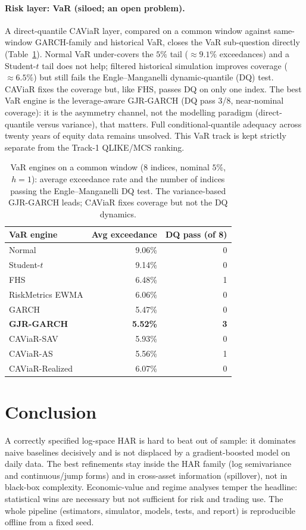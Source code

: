 \documentclass[11pt]{article}
\begin{document}
\paragraph{Risk layer: VaR (siloed; an open problem).} A direct-quantile CAViaR
\cite{engleman2004} layer, compared on a common window against same-window
GARCH-family \cite{bollerslev1986,gjr1993} and historical VaR, closes the VaR sub-question directly
(Table~\ref{tab:var}). Normal VaR under-covers the $5\%$ tail ($\approx 9.1\%$
exceedances) and a Student-$t$ tail does not help; filtered historical simulation
improves coverage ($\approx 6.5\%$) but still fails the Engle--Manganelli
dynamic-quantile (DQ) test. CAViaR fixes the coverage but, like FHS, passes DQ on
only one index. The best VaR engine is the leverage-aware GJR-GARCH (DQ pass 3/8,
near-nominal coverage): it is the asymmetry channel, not the modelling paradigm
(direct-quantile versus variance), that matters. Full conditional-quantile
adequacy across twenty years of equity data remains unsolved. This VaR track is
kept strictly separate from the Track-1 QLIKE/MCS ranking.

\begin{table}[h]
\centering
\caption{VaR engines on a common window (8 indices, nominal $5\%$, $h=1$): average
exceedance rate and the number of indices passing the Engle--Manganelli DQ test.
The variance-based GJR-GARCH leads; CAViaR fixes coverage but not the DQ dynamics.}
\label{tab:var}
\begin{tabular}{lrr}
\toprule
VaR engine & Avg exceedance & DQ pass (of 8) \\
\midrule
Normal              & 9.06\% & 0 \\
Student-$t$         & 9.14\% & 0 \\
FHS                 & 6.48\% & 1 \\
RiskMetrics EWMA    & 6.06\% & 0 \\
GARCH               & 5.47\% & 0 \\
\textbf{GJR-GARCH}  & \textbf{5.52\%} & \textbf{3} \\
CAViaR-SAV          & 5.93\% & 0 \\
CAViaR-AS           & 5.56\% & 1 \\
CAViaR-Realized     & 6.07\% & 0 \\
\bottomrule
\end{tabular}
\end{table}

\section{Conclusion}
A correctly specified log-space HAR is hard to beat out of sample: it dominates
naive baselines decisively and is not displaced by a gradient-boosted model on
daily data. The best refinements stay inside the HAR family (log semivariance
and continuous/jump forms) and in cross-asset information (spillover), not in
black-box complexity. Economic-value and regime analyses temper the headline:
statistical wins are necessary but not sufficient for risk and trading use. The
whole pipeline (estimators, simulator, models, tests, and report) is
reproducible offline from a fixed seed.
\end{document}
